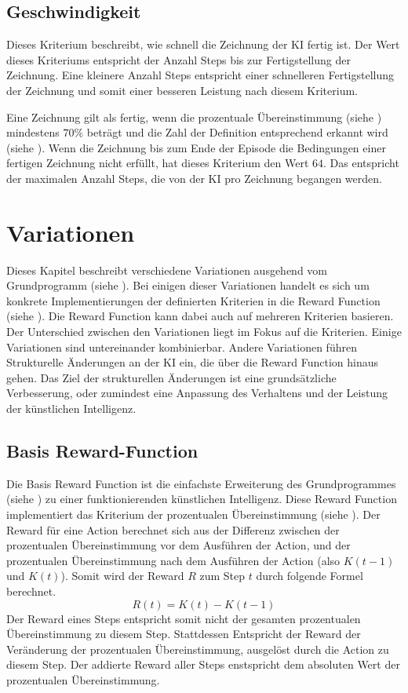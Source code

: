 \subsection{Geschwindigkeit}\label{sub:m_eval_speed}
Dieses Kriterium beschreibt, wie schnell die Zeichnung der KI fertig ist. Der
Wert dieses Kriteriums entspricht der Anzahl Steps bis zur Fertigstellung der
Zeichnung. Eine kleinere Anzahl Steps entspricht einer schnelleren Fertigstellung
der Zeichnung und somit einer besseren Leistung nach diesem Kriterium.

Eine Zeichnung gilt als fertig, wenn die prozentuale Übereinstimmung (siehe
) mindestens $70\%$ beträgt und die Zahl der Definition
entsprechend erkannt wird (siehe ). Wenn die Zeichnung
bis zum Ende der Episode die Bedingungen einer fertigen Zeichnung nicht erfüllt,
hat dieses Kriterium den Wert $64$. Das entspricht der maximalen Anzahl Steps,
die von der KI pro Zeichnung begangen werden.


\section{Variationen}\label{chap:m_var}
Dieses Kapitel beschreibt verschiedene Variationen ausgehend vom Grundprogramm
(siehe ). Bei einigen dieser Variationen handelt es sich
um konkrete Implementierungen der definierten Kriterien in die Reward Function
(siehe ). Die Reward Function kann dabei auch auf
mehreren Kriterien basieren. Der Unterschied zwischen den Variationen liegt im
Fokus auf die Kriterien. Einige Variationen sind untereinander kombinierbar.
Andere Variationen führen Strukturelle Änderungen an der KI ein, die über die
Reward Function hinaus gehen. Das Ziel der strukturellen Änderungen ist eine
grundsätzliche Verbesserung, oder zumindest eine Anpassung des Verhaltens und
der Leistung der künstlichen Intelligenz. 

\subsection{Basis Reward-Function}\label{sub:m_var_base}
Die Basis Reward Function ist die einfachste Erweiterung des Grundprogrammes
(siehe ) zu einer funktionierenden künstlichen
Intelligenz. Diese Reward Function implementiert das Kriterium der prozentualen
Übereinstimmung (siehe ). Der Reward für eine Action
berechnet sich aus der Differenz zwischen der prozentualen Übereinstimmung vor
dem Ausführen der Action, und der prozentualen Übereinstimmung nach dem
Ausführen der Action (also $K(t-1)$ und $K(t)$). Somit wird der Reward $R$ zum
Step $t$ durch folgende Formel berechnet. 
\[ R(t) = K(t) - K(t-1) \]
Der Reward eines Steps entspricht somit nicht der gesamten prozentualen
Übereinstimmung zu diesem Step. Stattdessen Entspricht der Reward der
Veränderung der prozentualen Übereinstimmung, ausgelöst durch die Action zu diesem
Step. Der addierte Reward aller Steps enstspricht dem absoluten Wert der
prozentualen Übereinstimmung.


